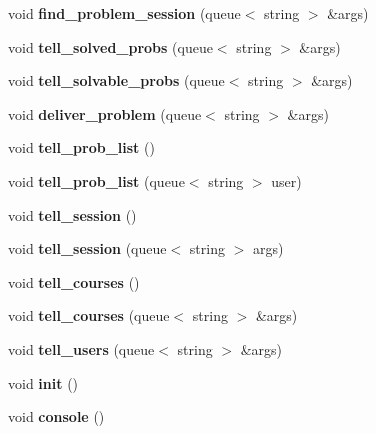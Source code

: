 \begin{DoxyCompactItemize}
void {\bfseries find\+\_\+problem\+\_\+session} (queue$<$ string $>$ \&args)
\item 
\mbox{\label{classEvaluator_aa5ff64304de2ece05f4438aaf0469f02}} 
void {\bfseries tell\+\_\+solved\+\_\+probs} (queue$<$ string $>$ \&args)
\item 
\mbox{\label{classEvaluator_ac769bb49ad46bbfd426465ca306115dd}} 
void {\bfseries tell\+\_\+solvable\+\_\+probs} (queue$<$ string $>$ \&args)
\item 
\mbox{\label{classEvaluator_a281b6f834d600b72544f237834d5414c}} 
void {\bfseries deliver\+\_\+problem} (queue$<$ string $>$ \&args)
\item 
\mbox{\label{classEvaluator_aa9982523eca5fcc5af5b934a159f02e1}} 
void {\bfseries tell\+\_\+prob\+\_\+list} ()
\item 
\mbox{\label{classEvaluator_a411583fdb1c6052a070d524e5b4e8f2d}} 
void {\bfseries tell\+\_\+prob\+\_\+list} (queue$<$ string $>$ user)
\item 
\mbox{\label{classEvaluator_ae977251330c34bb53d6838a796b5d946}} 
void {\bfseries tell\+\_\+session} ()
\item 
\mbox{\label{classEvaluator_aead845a9aca1fbbcc3bfc337fc0dcd1a}} 
void {\bfseries tell\+\_\+session} (queue$<$ string $>$ args)
\item 
\mbox{\label{classEvaluator_a614adf79cb025d82b68f5668073ee0ac}} 
void {\bfseries tell\+\_\+courses} ()
\item 
\mbox{\label{classEvaluator_a9c75c144c8ae10debfa413a7d05d9621}} 
void {\bfseries tell\+\_\+courses} (queue$<$ string $>$ \&args)
\item 
\mbox{\label{classEvaluator_abe72e0be482d2a41e097d40930805539}} 
void {\bfseries tell\+\_\+users} (queue$<$ string $>$ \&args)
\item 
\mbox{\label{classEvaluator_a1f9d0377931a621181e0d8b560da1f70}} 
void {\bfseries init} ()
\item 
\mbox{\label{classEvaluator_aacb5712721acaffc5d2082f2522ee35a}} 
void {\bfseries console} ()
\end{DoxyCompactItemize}


